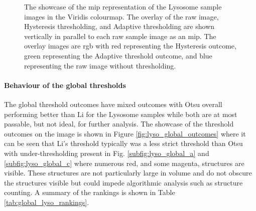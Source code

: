 \begin{figure}[h!]
    \centering
    \caption[Showcase of the MIP of the raw Lysosome sample images with the threshold overlay images vertically in parallel]{The showcase of the \gls{mip} representation of the Lysosome sample images in the Viridis colourmap. The overlay of the raw image, Hysteresis thresholding, and Adaptive thresholding are shown vertically in parallel to each raw sample image as an \gls{mip}. The overlay images are \gls{rgb} with red representing the Hysteresis outcome, green representing the Adaptive threshold outcome, and blue representing the raw image without thresholding.}
    \label{fig:raw_image_overlays_lyso}
\end{figure}
\paragraph{Behaviour of the global thresholds}
The global threshold outcomes have mixed outcomes with Otsu overall performing better than Li for the Lysosome samples while both are at most passable, but not ideal, for further analysis. The showcase of the threshold outcomes on the image is shown in Figure \ref{fig:lyso_global_outcomes} where it can be seen that Li's threshold typically was a less strict threshold than Otsu with under-thresholding present in Fig. \ref{subfig:lyso_global_a} and \ref{subfig:lyso_global_c} where numerous red, and some magenta, structures are visible. These structures are not particularly large in volume and do not obscure the structures visible but could impede algorithmic analysis such as structure counting. A summary of the rankings is shown in Table \ref{tab:global_lyso_rankings}.

